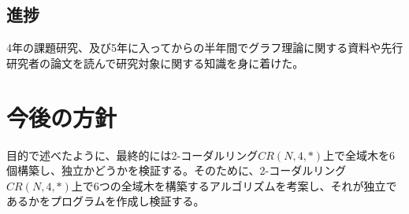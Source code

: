 \documentclass[twocolumn, 11pt]{jsarticle}
\begin{document}
    \subsection{進捗}
        4年の課題研究、及び5年に入ってからの半年間でグラフ理論に関する資料や先行研究者の論文を読んで研究対象に関する知識を身に着けた。

\section{今後の方針}
    目的で述べたように、最終的には2-コーダルリング$CR(N,4,*)$上で全域木を6個構築し、独立かどうかを検証する。そのために、2-コーダルリング$CR(N,4,*)$上で6つの全域木を構築するアルゴリズムを考案し、それが独立であるかをプログラムを作成し検証する。
    
    


\end{document}
